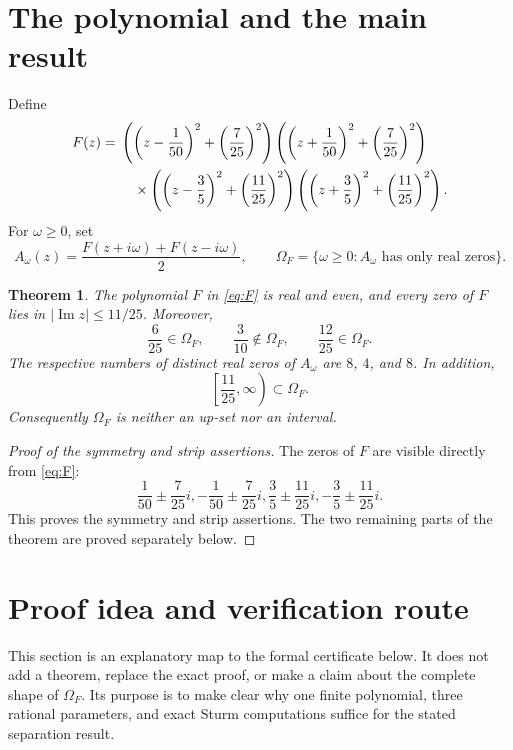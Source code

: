 \documentclass[11pt]{article}
\newtheorem{theorem}{Theorem}[section]
\newcommand{\OmegaF}{\Omega_F}
\begin{document}
\section{The polynomial and the main result}

Define
\begin{align}
F(z)={}&
\left(\left(z-\frac1{50}\right)^2+\left(\frac7{25}\right)^2\right)
\left(\left(z+\frac1{50}\right)^2+\left(\frac7{25}\right)^2\right)
\notag\\
&\quad\times
\left(\left(z-\frac35\right)^2+\left(\frac{11}{25}\right)^2\right)
\left(\left(z+\frac35\right)^2+\left(\frac{11}{25}\right)^2\right).
\label{eq:F}
\end{align}
For $\omega\geq0$, set
\begin{equation}
  A_\omega(z)=\frac{F(z+i\omega)+F(z-i\omega)}{2},
  \qquad
  \OmegaF=\{\omega\geq0:A_\omega\text{ has only real zeros}\}.
  \label{eq:Aomega}
\end{equation}

\begin{theorem}\label{thm:main}
The polynomial $F$ in \eqref{eq:F} is real and even, and every zero of $F$
lies in $|\operatorname{Im}z|\leq11/25$. Moreover,
\[
  \frac6{25}\in\OmegaF,
  \qquad
  \frac3{10}\notin\OmegaF,
  \qquad
  \frac{12}{25}\in\OmegaF.
\]
The respective numbers of distinct real zeros of $A_\omega$ are $8$, $4$,
and $8$. In addition,
\[
  \left[\frac{11}{25},\infty\right)\subset\OmegaF.
\]
Consequently $\OmegaF$ is neither an up-set nor an interval.
\end{theorem}

\begin{proof}[Proof of the symmetry and strip assertions]
The zeros of $F$ are visible directly from \eqref{eq:F}:
\[
 \frac1{50}\mathbin{\pm}\frac7{25}i,
 -\frac1{50}\mathbin{\pm}\frac7{25}i,
 \frac35\mathbin{\pm}\frac{11}{25}i,
 -\frac35\mathbin{\pm}\frac{11}{25}i.
\]
This proves the symmetry and strip assertions. The two remaining parts of
the theorem are proved separately below.
\end{proof}

\section{Proof idea and verification route}

This section is an explanatory map to the formal certificate below. It does
not add a theorem, replace the exact proof, or make a claim about the complete
shape of $\OmegaF$. Its purpose is to make clear why one finite polynomial,
three rational parameters, and exact Sturm computations suffice for the stated
separation result.
\end{document}
